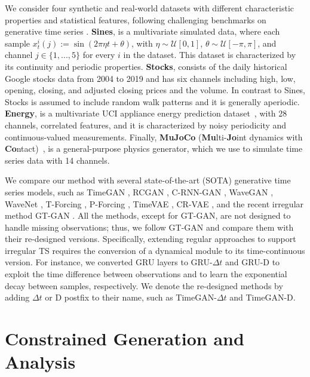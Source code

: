 \documentclass{article} %
\begin{document}
We consider four synthetic and real-world datasets with different characteristic properties and statistical features, following challenging benchmarks on generative time series \citep{yoon2019time, jeon2022gt}. \textbf{Sines}, is a multivariate simulated data, where each sample $x_t^i(j) := \sin(2\pi\eta t+\theta)$, with $\eta \sim \mathcal{U}[0,1]$, $\theta \sim \mathcal{U}[-\pi,\pi]$, and channel $j \in \{1, ..., 5\}$ for every $i$ in the dataset. This dataset is characterized by its continuity and periodic properties. \textbf{Stocks}, consists of the daily historical Google stocks data from 2004 to 2019 and has six channels including high, low, opening, closing, and adjusted closing prices and the volume. In contrast to Sines, Stocks is assumed to include random walk patterns and it is generally aperiodic. \textbf{Energy}, is a multivariate UCI appliance energy prediction dataset~\citep{misc_appliances_energy_prediction_374}, with 28 channels, correlated features, and it is characterized by noisy periodicity and continuous-valued measurements. Finally, \textbf{MuJoCo} (\textbf{Mu}lti-\textbf{Jo}int dynamics with \textbf{Co}ntact)~\citep{todorov2012mujoco}, is a general-purpose physics generator, which we use to simulate time series data with 14 channels. 

We compare our method with several state-of-the-art (SOTA) generative time series models, such as TimeGAN \citep{yoon2019time}, RCGAN \citep{esteban2017real}, C-RNN-GAN \citep{mogren2016c}, WaveGAN \citep{donahue2018adversarial}, WaveNet \citep{oord2016wavenet}, T-Forcing \citep{graves2013generating}, P-Forcing \citep{goyal2016professor}, TimeVAE \citep{desai2021timevae}, CR-VAE \citep{li2023causal}, and the recent irregular method GT-GAN \citep{jeon2022gt}. All the methods, except for GT-GAN, are not designed to handle missing observations; thus, we follow GT-GAN and compare them with their re-designed versions. Specifically, extending regular approaches to support irregular TS requires the conversion of a dynamical module to its time-continuous version. For instance, we converted GRU layers to GRU-$\Delta t$ and GRU-D to exploit the time difference between observations and to learn the exponential decay between samples, respectively. We denote the re-designed methods by adding $\Delta t$ or D postfix to their name, such as TimeGAN-$\Delta t$ and TimeGAN-D. 


\section{Constrained Generation and Analysis}
\label{app:spectral_koopman}
\end{document}
